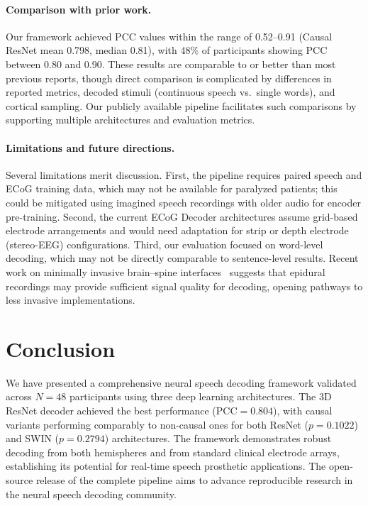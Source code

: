 \documentclass[11pt]{article}
\begin{document}
\paragraph{Comparison with prior work.} Our framework achieved PCC values within the range of 0.52--0.91 (Causal ResNet mean 0.798, median 0.81), with 48\% of participants showing PCC between 0.80 and 0.90. These results are comparable to or better than most previous reports, though direct comparison is complicated by differences in reported metrics, decoded stimuli (continuous speech vs.\ single words), and cortical sampling. Our publicly available pipeline facilitates such comparisons by supporting multiple architectures and evaluation metrics.

\paragraph{Limitations and future directions.} Several limitations merit discussion. First, the pipeline requires paired speech and ECoG training data, which may not be available for paralyzed patients; this could be mitigated using imagined speech recordings with older audio for encoder pre-training. Second, the current ECoG Decoder architectures assume grid-based electrode arrangements and would need adaptation for strip or depth electrode (stereo-EEG) configurations. Third, our evaluation focused on word-level decoding, which may not be directly comparable to sentence-level results. Recent work on minimally invasive brain--spine interfaces~\citep{lorenz2024epidural} suggests that epidural recordings may provide sufficient signal quality for decoding, opening pathways to less invasive implementations.

\section{Conclusion}

We have presented a comprehensive neural speech decoding framework validated across $N=48$ participants using three deep learning architectures. The 3D ResNet decoder achieved the best performance (PCC${}=0.804$), with causal variants performing comparably to non-causal ones for both ResNet ($p=0.1022$) and SWIN ($p=0.2794$) architectures. The framework demonstrates robust decoding from both hemispheres and from standard clinical electrode arrays, establishing its potential for real-time speech prosthetic applications. The open-source release of the complete pipeline aims to advance reproducible research in the neural speech decoding community.


\end{document}
